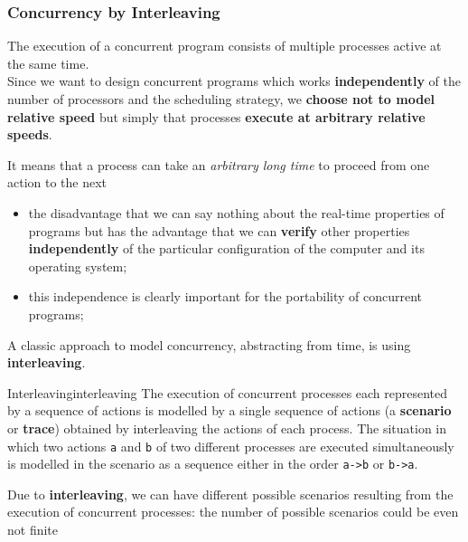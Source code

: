 \subsubsection{Concurrency by Interleaving}\label{sub:md_concurrency_by_interleaving} %
The execution of a concurrent program consists of multiple processes active at the same time.
\\
Since we want to design concurrent programs which works \textbf{independently} of the number of processors and the scheduling strategy, we \textbf{choose not to model relative speed} but simply that processes \textbf{execute at arbitrary relative speeds}.
\begin{note}
    It means that a process can take an \textit{arbitrary long time} to proceed from one action to the next
\end{note}
\begin{warning}
    \begin{itemize}
        \item the disadvantage that we can say nothing about the real-time properties of programs but has the advantage that we can \textbf{verify} other properties \textbf{independently} of the particular configuration of the computer and its operating system;
        \item this independence is clearly important for the portability of concurrent programs;
    \end{itemize}
\end{warning}
A classic approach to model concurrency, abstracting from time, is using \textbf{interleaving}.
\\
\begin{definition}{Interleaving}{interleaving}
    The execution of concurrent processes each represented by a sequence of actions is modelled by a single sequence of actions (a \textbf{scenario} or \textbf{trace}) obtained by interleaving the actions of each process.
    The situation in which two actions \texttt{a} and \texttt{b} of two different processes are executed simultaneously is modelled in the scenario as a sequence either in the order \texttt{a->b} or \texttt{b->a}.
\end{definition}
\begin{critical}
    Due to \textbf{interleaving}, we can have different possible scenarios resulting from the execution of concurrent processes: the number of possible scenarios could be even not finite
\end{critical}
%
